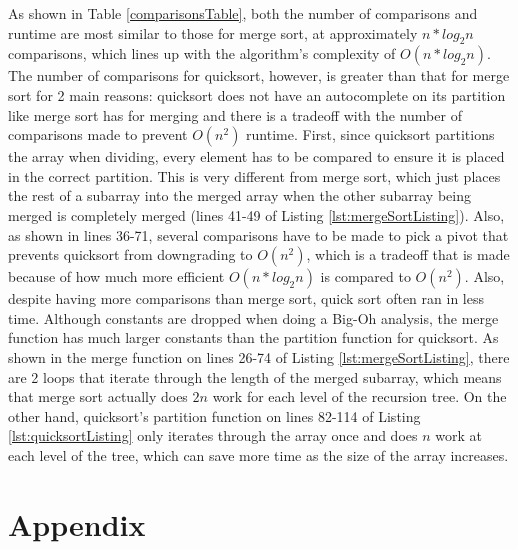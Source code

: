 \documentclass[letterpaper, 10pt,DIV=13]{scrartcl}
\numberwithin{equation}{section} %
\numberwithin{figure}{section} %
\numberwithin{table}{section} %
\begin{document}
As shown in Table \ref{comparisonsTable}, both the number of comparisons and runtime are most similar to those for merge sort, at approximately $n * log_2n$ comparisons, which lines up with the algorithm's complexity of $O(n * log_2n)$. The number of comparisons for quicksort, however, is greater than that for merge sort for 2 main reasons: quicksort does not have an autocomplete on its partition like merge sort has for merging and there is a tradeoff with the number of comparisons made to prevent $O(n^2)$ runtime. First, since quicksort partitions the array when dividing, every element has to be compared to ensure it is placed in the correct partition. This is very different from merge sort, which just places the rest of a subarray into the merged array when the other subarray being merged is completely merged (lines 41-49 of Listing \ref{lst:mergeSortListing}). Also, as shown in lines 36-71, several comparisons have to be made to pick a pivot that prevents quicksort from downgrading to $O(n^2)$, which is a tradeoff that is made because of how much more efficient $O(n * log_2n)$ is compared to $O(n^2)$. Also, despite having more comparisons than merge sort, quick sort often ran in less time. Although constants are dropped when doing a Big-Oh analysis, the merge function has much larger constants than the partition function for quicksort. As shown in the merge function on lines 26-74 of Listing \ref{lst:mergeSortListing}, there are 2 loops that iterate through the length of the merged subarray, which means that merge sort actually does $2n$ work for each level of the recursion tree. On the other hand, quicksort's partition function on lines 82-114 of Listing \ref{lst:quicksortListing} only iterates through the array once and does $n$ work at each level of the tree, which can save more time as the size of the array increases.

\section{Appendix}
\end{document}
